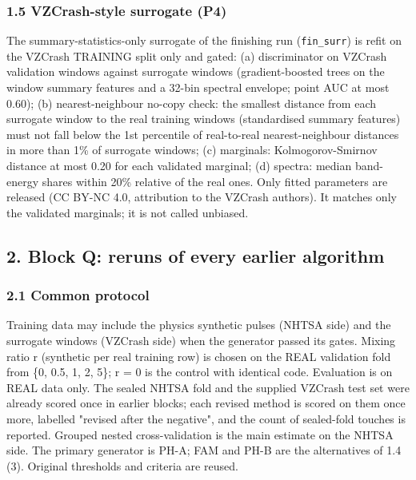 \subsubsection*{1.5 VZCrash-style surrogate (P4)}
The summary-statistics-only surrogate of the finishing run (\texttt{fin\_surr}) is refit on the VZCrash TRAINING split only and gated: (a) discriminator on VZCrash validation windows against surrogate windows (gradient-boosted trees on the window summary features and a 32-bin spectral envelope; point AUC at most 0.60); (b) nearest-neighbour no-copy check: the smallest distance from each surrogate window to the real training windows (standardised summary features) must not fall below the 1st percentile of real-to-real nearest-neighbour distances in more than 1\% of surrogate windows; (c) marginals: Kolmogorov-Smirnov distance at most 0.20 for each validated marginal; (d) spectra: median band-energy shares within 20\% relative of the real ones. Only fitted parameters are released (CC BY-NC 4.0, attribution to the VZCrash authors). It matches only the validated marginals; it is not called unbiased.

\subsection*{2. Block Q: reruns of every earlier algorithm}

\subsubsection*{2.1 Common protocol}
Training data may include the physics synthetic pulses (NHTSA side) and the surrogate windows (VZCrash side) when the generator passed its gates. Mixing ratio r (synthetic per real training row) is chosen on the REAL validation fold from \{0, 0.5, 1, 2, 5\}; r = 0 is the control with identical code. Evaluation is on REAL data only. The sealed NHTSA fold and the supplied VZCrash test set were already scored once in earlier blocks; each revised method is scored on them once more, labelled "revised after the negative", and the count of sealed-fold touches is reported. Grouped nested cross-validation is the main estimate on the NHTSA side. The primary generator is PH-A; FAM and PH-B are the alternatives of 1.4 (3). Original thresholds and criteria are reused.


